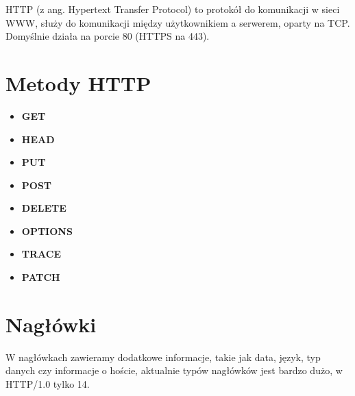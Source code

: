 HTTP (z ang. Hypertext Transfer Protocol) to protokół do komunikacji w sieci WWW, służy do komunikacji między użytkownikiem a serwerem, oparty na TCP. Domyślnie działa na porcie 80 (HTTPS na 443).

\section{Metody HTTP}
\begin{multicols}{2}
	\begin{itemize}
		\item \textbf{GET}
		\item \textbf{HEAD}
		\item \textbf{PUT}
		\item \textbf{POST}
		\item \textbf{DELETE}
		\item \textbf{OPTIONS}
		\item \textbf{TRACE}
		\item \textbf{PATCH}
	\end{itemize}
\end{multicols}

\section{Nagłówki}
W nagłówkach zawieramy dodatkowe informacje, takie jak data, język, typ danych czy informacje o hoście, aktualnie typów nagłówków jest bardzo dużo, w HTTP/1.0 tylko 14.

